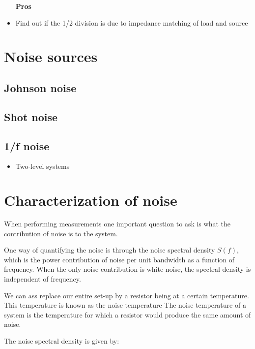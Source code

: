 \documentclass[12pt]{report}
\begin{document}
\begin{itemize}
    \item [\textbf{Pros}]
    \item Find out if the 1/2 division is due to impedance matching of load and source
\end{itemize}





\section{Noise sources}

\subsection{Johnson noise}

\subsection{Shot noise}

\subsection{1/f noise}
\begin{itemize}
    \item Two-level systems
\end{itemize}


\section{Characterization of noise}

When performing measurements one important question to ask is what the contribution of noise is to the system.

One way of quantifying the noise is through the noise spectral density $S(f)$, which is the power contribution of noise per unit bandwidth as a function of frequency. When the only noise contribution is white noise, the spectral density is independent of frequency.

We can ass
replace our entire set-up by a resistor being at a certain temperature. This temperature is known as the noise temperature
The noise temperature of a system is the temperature for which a resistor would produce the same amount of noise.

The noise spectral density is given by:
\end{document}
